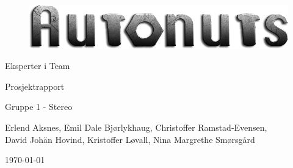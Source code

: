 \begin{titlepage}
\begin{center}
\vspace*{1in}
\begin{figure}[H]
		\centering
		\includegraphics[width=1.00\textwidth]{images/logo.png}
		\label{fig:logo}
	\end{figure}
\vspace{3in}
{\LARGE Eksperter i Team}
\par
\vspace{0.2in}
{\LARGE Prosjektrapport}
\par
\vspace{0.2in}
{\Large Gruppe 1 - Stereo}
\par
\vfill
\par
\vspace{0.1in}
Erlend Aksnes, Emil Dale Bjørlykhaug, Christoffer Ramstad-Evensen, \\David Johän Hovind, Kristoffer Løvall, Nina Margrethe Smørsgård
\par
\vspace{0.4cm}
\today
\end{center}
\end{titlepage}

